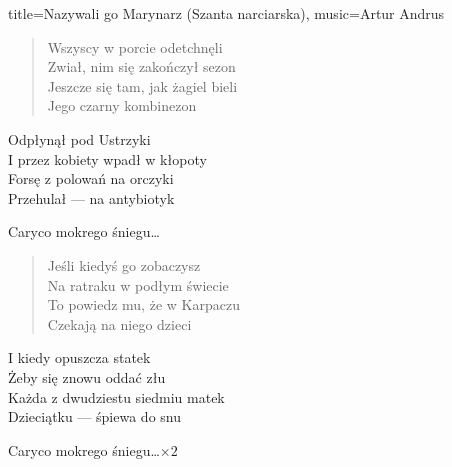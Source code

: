 \begin{song}{title={Nazywali go Marynarz (Szanta narciarska)}, music={Artur Andrus}}
\begin{multicols}{2}
\begin{verse}
        Wszyscy w porcie odetchnęli \\
        Zwiał, nim się zakończył sezon \\
        Jeszcze się tam, jak żagiel bieli \\
        Jego czarny kombinezon
    \end{verse}
    \begin{verse*}
        Odpłynął pod Ustrzyki \\
        I przez kobiety wpadł w kłopoty \\
        Forsę z polowań na orczyki \\
        Przehulał --- na antybiotyk
    \end{verse*}
    \begin{chorus}
        Caryco mokrego śniegu\ldots
    \end{chorus}
    \begin{verse}
        Jeśli kiedyś go zobaczysz \\
        Na ratraku w podłym świecie \\
        To powiedz mu, że w Karpaczu \\
        Czekają na niego dzieci
    \end{verse}
    \begin{verse*}
        I kiedy opuszcza statek \\
        Żeby się znowu oddać złu \\
        Każda z dwudziestu siedmiu matek \\
        Dzieciątku --- śpiewa do snu
    \end{verse*}
    \begin{chorus}
        Caryco mokrego śniegu\ldots $\times 2$
    \end{chorus}
    \end{multicols}
\end{song}

